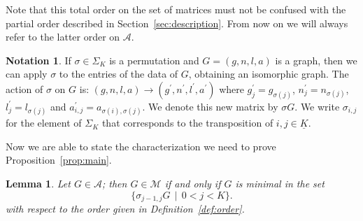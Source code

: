 \documentclass{amsart}
\theoremstyle{plain}
\newtheorem{lemma}[theorem]{Lemma}
\theoremstyle{definition}
\newtheorem{notation}[theorem]{Notation}
\newcommand{\ubar}[1]{\underline{#1}}
\begin{document}
Note that this total order on the set of matrices must not be confused
with the partial order described in
Section~\ref{sec:description}. From now on we will always refer to the
latter order on $\mathcal{A}$.

\begin{notation}
  If $\sigma \in \Sigma_K$ is a permutation and $G = (g, n, l, a)$ is
  a graph, then we can apply $\sigma$ to the entries of the data of
  $G$, obtaining an isomorphic graph. The action of $\sigma$ on $G$
  is: $(g,n,l,a)\to (g^\prime,n^\prime,l^\prime,a^\prime)$ where
  $g^\prime_j=g_{\sigma(j)}$, $n^\prime_j=n_{\sigma(j)}$,
  $l^\prime_j=l_{\sigma(j)}$ and $a^\prime_{i,j} =
  a_{\sigma(i),\sigma(j)}$. We denote this new matrix by $\sigma
  G$. We write $\sigma_{i,j}$ for the element of $\Sigma_K$ that
  corresponds to the transposition of $i, j \in \ubar{K}$.
\end{notation}

Now we are able to state the characterization we need to prove
Proposition~\ref{prop:main}.

\begin{lemma}\label{lemma:char}
  Let $G \in \mathcal{A}$; then $G \in \mathcal{M}$ if and only if $G$
  is minimal in the set
  \[
  \bigl\{ \sigma_{j-1,j} G \,\mid\, 0<j<K \bigr\}\text{.}
  \]
  with respect to the order given in Definition~\ref{def:order}.
\end{lemma}
\end{document}
